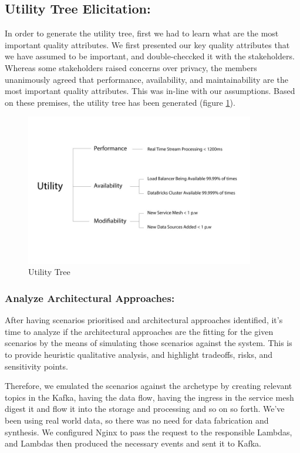 \documentclass[review]{elsarticle}
\begin{document}
\subsection{Utility Tree Elicitation:}
In order to generate the utility tree, first we had to learn what are the most important quality attributes. We first presented our key quality attributes that we have assumed to be important, and double-checcked it with the stakeholders. Whereas some stakeholders raised concerns over privacy, the members unanimously agreed that performance, availability, and maintainability are the most important quality attributes. This was in-line with our assumptions. Based on these premises, the utility tree has been generated (figure \ref{fig:utility-tree}).

\begin{figure}[h!]
    \centering
    \includegraphics[width=10cm]{Media/Utility-tree.jpg}
    \caption{Utility Tree}
    \label{fig:utility-tree}
\end{figure}

\subsubsection{Analyze Architectural Approaches:}

After having scenarios prioritised and architectural approaches identified, it's time to analyze if the architectural approaches are the fitting for the given scenarios by the means of simulating those scenarios against the system. This is to provide heuristic qualitative analysis, and highlight tradeoffs, risks, and sensitivity points.

Therefore, we emulated the scenarios against the archetype by creating relevant topics in the Kafka, having the data flow, having the ingress in the service mesh digest it and flow it into the storage and processing and so on so forth. We've been using real world data, so there was no need for data fabrication and synthesis.  We configured Nginx to pass the request to the responsible Lambdas, and Lambdas then produced the necessary events and sent it to Kafka.
\end{document}
